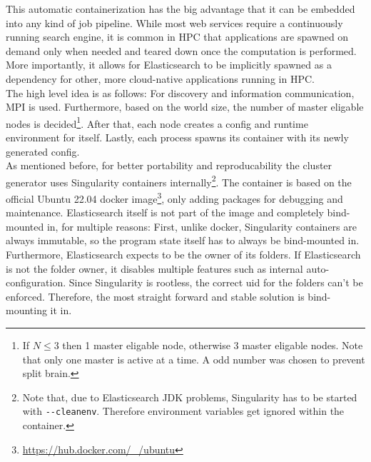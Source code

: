This automatic containerization has the big advantage that it can be embedded into any kind of job pipeline. While most web services require a continuously running search engine, it is common in \ac{HPC} that applications are spawned on demand only when needed and teared down once the computation is performed. More importantly, it allows for Elasticsearch to be implicitly spawned as a dependency for other, more cloud-native applications running in \ac{HPC}.\\

The high level idea is as follows: For discovery and information communication, \ac{MPI} is used. Furthermore, based on the world size, the number of master eligable nodes is decided\footnote{If $N \leq 3$ then 1 master eligable node, otherwise 3 master eligable nodes. Note that only one master is active at a time. A odd number was chosen to prevent split brain.}. After that, each node creates a config and runtime environment for itself. Lastly, each process spawns its container with its newly generated config.\\

As mentioned before, for better portability and reproducability the cluster generator uses Singularity containers internally\footnote{Note that, due to Elasticsearch JDK problems, Singularity has to be started with \texttt{-{}-cleanenv}. Therefore environment variables get ignored within the container.}. The container is based on the official Ubuntu 22.04 docker image\footnote{\url{https://hub.docker.com/_/ubuntu}}, only adding packages for debugging and maintenance. Elasticsearch itself is not part of the image and completely bind-mounted in, for multiple reasons: First, unlike docker, Singularity containers are always immutable, so the program state itself has to always be bind-mounted in. Furthermore, Elasticsearch expects to be the owner of its folders. If Elasticsearch is not the folder owner, it disables multiple features such as internal auto-configuration. Since Singularity is rootless, the correct uid for the folders can't be enforced. Therefore, the most straight forward and stable solution is bind-mounting it in.\\

